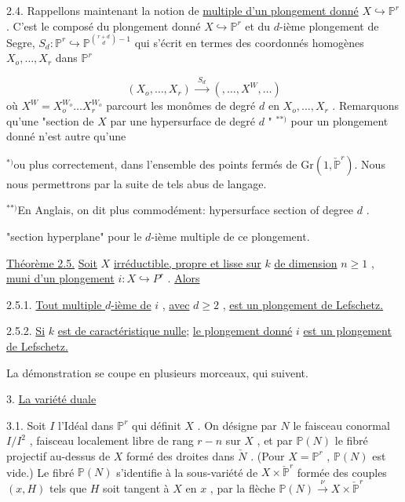 2.4.    Rappellons maintenant la notion de  \underline{multiple d'un plongement donné}  $X \hookrightarrow \mathbb{P}^r$  . C'est le composé du plongement donné  $X \hookrightarrow \mathbb{P}^r$ et du $d$-ième plongement de Segre,  $S_d : \mathbb{P}^r \hookrightarrow \mathbb{P}^{\binom{r+d}{d}-1}$  qui s'écrit en termes des coordonnés homogènes  $X_o,\ldots,X_r$  dans  $\mathbb{P}^r$

\begin{equation*}
(X_o,\ldots,X_r) \xrightarrow{\ \ S_d\ \ } (,\ldots,X^W,\ldots)
\end{equation*}
où  $X^W = X_o^{W_o} \ldots X_r^{W_o}$  parcourt les monômes de degré  $d$  en $X_o,\ldots,X_r$  . Remarquons qu'une "section de  $X$  par une hypersurface de degré  $d$ " $^{**)}$ pour un plongement donné n'est autre qu'une 

$^{*)}$ou plus correctement, dans l'ensemble des points fermés de $\mathrm{Gr}(1,\check{\mathbb{P}}^r)$. Nous nous permettrons par la suite de tels abus de langage.

$^{**)}$En Anglais, on  dit plus commodément: hypersurface section of degree $d$ .



 "section hyperplane" pour  le $d$-ième multiple de ce plongement.

\underline{Théorème 2.5.}    \underline{Soit}  $X$  \underline{irréductible, propre et lisse sur}  $k$  \underline{de dimension} $n \geq 1$  ,  \underline{muni d'un plongement}  $i : X \hookrightarrow P^r$  . \underline{Alors}

2.5.1. \underline{Tout multiple $d$-ième de}  $i$  ,  \underline{avec}  $d \geq 2$  ,  \underline{est un plongement de Lefschetz.}

2.5.2. \underline{Si}  $k$  \underline{est de caractéristique nulle}; \underline{le plongement donné}  $i$ \underline{est un plongement de Lefschetz.}

La démonstration se coupe en plusieurs morceaux, qui suivent.


3. \underline{La variété duale}

3.1.    Soit  $I$  l'Idéal dans  $\mathbb{P}^r$  qui définit  $X$  . On désigne par $N$  le faisceau conormal  $I/I^2$  , faisceau localement libre de rang $r-n$  sur  $X$  , et par  $\mathbb{P}(N)$  le fibré projectif au-dessus de  $X$ formé des droites dans  $\check{N}$  . (Pour  $X = \mathbb{P}^r$  ,  $\mathbb{P}(N)$  est vide.) Le fibré  $\mathbb{P}(N)$  s'identifie à la sous-variété de  $X \times \check{\mathbb{P}}^r$  formée des couples  $(x, H)$  tels que  $H$  soit tangent à  $X$  en  $x$  , par la flèche  $\mathbb{P}(N) \xrightarrow{\ \nu\ } X \times \check{\mathbb{P}}^r$


